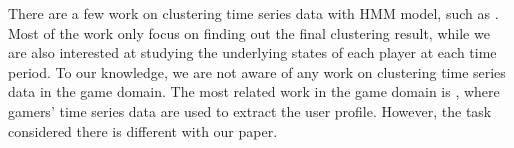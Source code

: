 There are a few work on clustering time series data with HMM model, such as
\cite{Bicego2006,bicego2003,coviello2014}. Most of the work only focus on finding
out the final clustering result, while we are also interested at studying
the underlying states of each player at each time period. To our knowledge, 
we are not aware of any work on clustering time series data in the game domain.
The most related work in the game domain is \cite{menendez2014},
where gamers' time series data are used to extract the user profile.
However, the task considered there is different with our paper.

